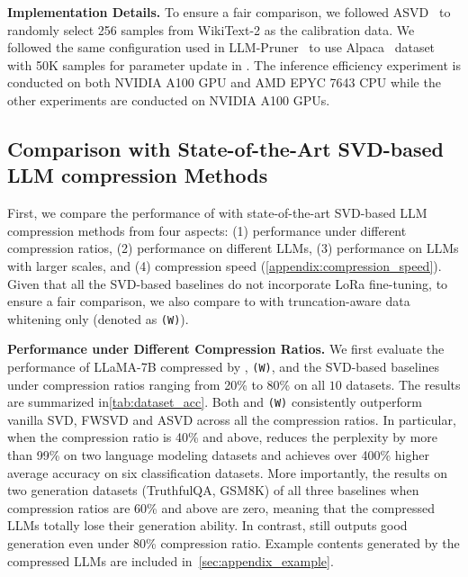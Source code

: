 %
\textbf{Implementation Details.}
%
To ensure a fair comparison, we followed ASVD~\citep{DBLP:journals/corr/abs-2312-05821} to randomly select 256 samples from WikiText-2 as the calibration data. 
We followed the same configuration used in LLM-Pruner~\citep{DBLP:conf/nips/MaFW23} to use Alpaca~\citep{alpaca} dataset with 50K samples for parameter update in \sysname.
The inference efficiency experiment is conducted on both NVIDIA A100 GPU and AMD EPYC 7643 CPU while the other experiments are conducted on NVIDIA A100 GPUs.

\vspace{-2mm}
\subsection{Comparison with State-of-the-Art SVD-based LLM compression Methods}
\label{subsec:overall_performance}
\vspace{-2mm}
First, we compare the performance of \sysname with state-of-the-art SVD-based LLM compression methods from four aspects: (1) performance under different compression ratios, (2) performance on different LLMs, (3) performance on LLMs with larger scales, and (4) compression speed (\cref{appendix:compression_speed}). 
%
Given that all the SVD-based baselines do not incorporate LoRa fine-tuning, to ensure a fair comparison, we also compare to 
\sysname with truncation-aware data whitening only (denoted as \sysname \texttt{(W)}).

\accuracyTable
\differntllmaccuracyTable
\textbf{Performance under Different Compression Ratios.}
We first evaluate the performance of LLaMA-7B compressed by \sysname, \sysname \texttt{(W)}, and the SVD-based baselines under compression ratios ranging from 20\% to 80\% on all $10$ datasets. 
%
The results are summarized in\cref{tab:dataset_acc}. Both \sysname and \sysname \texttt{(W)} consistently outperform vanilla SVD, FWSVD and ASVD across all the compression ratios. In particular, when the compression ratio is 40\% and above, \sysname reduces the perplexity by more than 99\% on two language modeling datasets and achieves over 400\% higher average accuracy on six classification datasets. More importantly, the results on two generation datasets (TruthfulQA, GSM8K) of all three baselines when compression ratios are 60\% and above are zero, meaning that the compressed LLMs totally lose their generation ability. In contrast, \sysname still outputs good generation even under 80\% compression ratio. 
%
Example contents generated by the compressed LLMs are included in~\cref{sec:appendix_example}.
%

